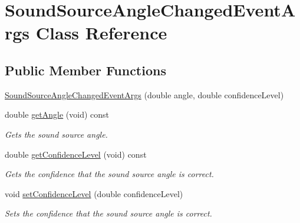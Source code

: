 \hypertarget{class_sound_source_angle_changed_event_args}{\section{\-Sound\-Source\-Angle\-Changed\-Event\-Args \-Class \-Reference}
\label{class_sound_source_angle_changed_event_args}
}
\subsection*{\-Public \-Member \-Functions}
\begin{DoxyCompactItemize}
\item 
\hyperlink{class_sound_source_angle_changed_event_args_a2587badd39682d007d22ea97b177232e}{\-Sound\-Source\-Angle\-Changed\-Event\-Args} (double angle, double confidence\-Level)
\item 
double \hyperlink{class_sound_source_angle_changed_event_args_a60bacecce43950a62c74b68a59863dbb}{get\-Angle} (void) const 
\begin{DoxyCompactList}\small\item\em \-Gets the sound source angle. \end{DoxyCompactList}\item 
double \hyperlink{class_sound_source_angle_changed_event_args_ae3a276ed68991195039baffcdcae685e}{get\-Confidence\-Level} (void) const 
\begin{DoxyCompactList}\small\item\em \-Gets the confidence that the sound source angle is correct. \end{DoxyCompactList}\item 
void \hyperlink{class_sound_source_angle_changed_event_args_a439eeca6616e6c5a2ab8085d29cf9dae}{set\-Confidence\-Level} (double confidence\-Level)
\begin{DoxyCompactList}\small\item\em \-Sets the confidence that the sound source angle is correct. \end{DoxyCompactList}\end{DoxyCompactItemize}


